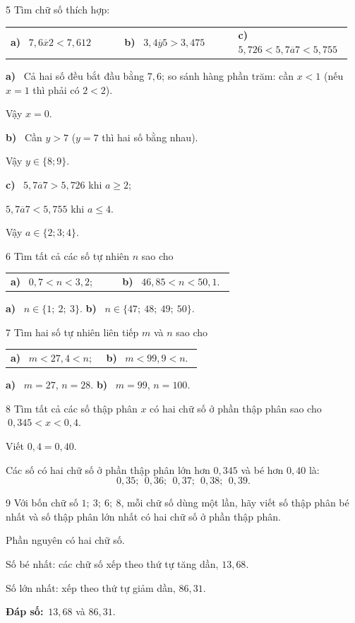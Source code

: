 \documentclass[11pt]{article}
\makeatletter
\newif\ifsol \solfalse
\renewcommand{\arraystretch}{1.35}
\providecommand{\AnsWord}{Đáp số}
\newcommand{\dapso}[1]{\par\textbf{\AnsWord:}\ #1}
\newcommand{\probsol}[1]{%
  \begin{lrbox}{\solmeasure}\begin{minipage}{\dimexpr\linewidth-24pt\relax}#1\end{minipage}\end{lrbox}%
  \ifsol
    \begin{solbox}#1\end{solbox}%
  \else
    \setlength{\solht}{\dimexpr\ht\solmeasure+\dp\solmeasure+0.85cm\relax}%
    \ifdim\solht<1.35cm\setlength{\solht}{1.35cm}\fi
    \begin{tcolorbox}[colback=white,colframe=Line,boxrule=0.8pt,arc=5pt,
      left=8pt,right=8pt,top=4pt,bottom=4pt,height=\solht]{\footnotesize\color{Slate}\itshape\WorkWord}\end{tcolorbox}%
  \fi}
\newcommand{\nd}[1]{\overline{#1}}
\newcommand{\pa}[1]{\textbf{#1)}\ }
\newenvironment{cols2}{\par\vspace{3pt}\noindent\setlength{\tabcolsep}{0pt}\renewcommand{\arraystretch}{1.3}%
  \begin{tabular}{@{}>{\raggedright\arraybackslash\rule{0pt}{4.4ex}}p{0.48\linewidth}<{\rule[-2.3ex]{0pt}{0pt}}@{\hspace{0.03\linewidth}}>{\raggedright\arraybackslash\rule{0pt}{4.4ex}}p{0.48\linewidth}<{\rule[-2.3ex]{0pt}{0pt}}@{}}}%
  {\end{tabular}\par}
\newenvironment{cols3}{\par\vspace{3pt}\noindent\setlength{\tabcolsep}{0pt}\renewcommand{\arraystretch}{1.3}%
  \begin{tabular}{@{}>{\raggedright\arraybackslash\rule{0pt}{4.4ex}}p{0.32\linewidth}<{\rule[-2.3ex]{0pt}{0pt}}@{\hspace{0.015\linewidth}}>{\raggedright\arraybackslash\rule{0pt}{4.4ex}}p{0.32\linewidth}<{\rule[-2.3ex]{0pt}{0pt}}@{\hspace{0.015\linewidth}}>{\raggedright\arraybackslash\rule{0pt}{4.4ex}}p{0.32\linewidth}<{\rule[-2.3ex]{0pt}{0pt}}@{}}}%
  {\end{tabular}\par}
\newcommand{\gap}{\vspace{0.3cm}}
\def\WorkWord{Bài làm:}
\def\AnsWord{Đáp số}
\makeatother
\begin{document}
\gap
\begin{probbox}{5}{\relax}
Tìm chữ số thích hợp:
\begin{cols3}
\pa{a} $7{,}6\nd{x}2<7{,}612$ & \pa{b} $3{,}4\nd{y}5>3{,}475$ & \pa{c} $5{,}726<5{,}7\nd{a}7<5{,}755$
\end{cols3}
\end{probbox}
\probsol{
\pa{a} Cả hai số đều bắt đầu bằng $7{,}6$; so sánh hàng phần trăm: cần $x<1$ (nếu $x=1$ thì phải có $2<2$).\par Vậy $x=0$.\par
\pa{b} Cần $y>7$ ($y=7$ thì hai số bằng nhau).\par Vậy $y\in\{8;9\}$.\par
\pa{c} $5{,}7\nd{a}7>5{,}726$ khi $a\ge2$;\par $5{,}7\nd{a}7<5{,}755$ khi $a\le4$.\par Vậy $a\in\{2;3;4\}$.
}
\gap
\begin{probbox}{6}{\relax}
Tìm tất cả các số tự nhiên $n$ sao cho
\begin{cols2}
\pa{a} $0{,}7<n<3{,}2$; & \pa{b} $46{,}85<n<50{,}1$.
\end{cols2}
\end{probbox}
\probsol{
\pa{a} $n\in\{1;\ 2;\ 3\}$. \qquad \pa{b} $n\in\{47;\ 48;\ 49;\ 50\}$.
}
\gap
\begin{probbox}{7}{\relax}
Tìm hai số tự nhiên liên tiếp $m$ và $n$ sao cho
\begin{cols2}
\pa{a} $m<27{,}4<n$; & \pa{b} $m<99{,}9<n$.
\end{cols2}
\end{probbox}
\probsol{
\pa{a} $m=27$, $n=28$. \qquad \pa{b} $m=99$, $n=100$.
}
\gap
\begin{probbox}{8}{\relax}
Tìm tất cả các số thập phân $x$ có hai chữ số ở phần thập phân sao cho $\ 0{,}345<x<0{,}4$.
\end{probbox}
\probsol{
Viết $0{,}4=0{,}40$.\par Các số có hai chữ số ở phần thập phân lớn hơn $0{,}345$ và bé hơn $0{,}40$ là:
\[0{,}35;\ \ 0{,}36;\ \ 0{,}37;\ \ 0{,}38;\ \ 0{,}39.\]
}
\gap
\begin{probbox}{9}{\relax}
Với bốn chữ số $1;\ 3;\ 6;\ 8$, mỗi chữ số dùng một lần, hãy viết số thập phân bé nhất và số thập phân lớn nhất có hai chữ số ở phần thập phân.
\end{probbox}
\probsol{
Phần nguyên có hai chữ số.\par Số bé nhất: các chữ số xếp theo thứ tự tăng dần, $13{,}68$.\par Số lớn nhất: xếp theo thứ tự giảm dần, $86{,}31$.
\dapso{$13{,}68$ và $86{,}31$.}}
\end{document}
